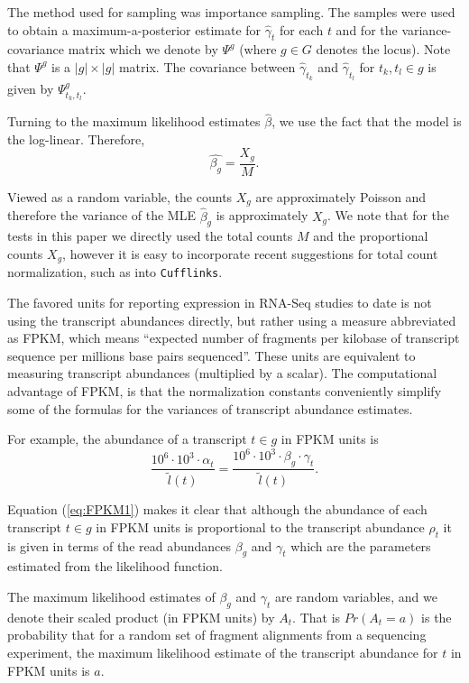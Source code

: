 \documentclass[12pt]{amsart}
\theoremstyle{definition}
\begin{document}
The method used for sampling was importance sampling. The samples were used to obtain a maximum-a-posterior estimate for
$\hat{\gamma}_t$ for each $t$ and for the variance-covariance matrix which we
denote by $\Psi^g$ (where $g \in G$ denotes the locus). Note that $\Psi^g$ is
a $|g| \times |g|$ matrix. The covariance between $\hat{\gamma}_{t_k}$ and
$\hat{\gamma}_{t_l}$ for $t_k,t_l \in g$ is given by $\Psi^g_{t_k,t_l}$.

Turning to the maximum likelihood estimates $\hat{\beta}$, we use the fact that the model is the log-linear. Therefore, 
\begin{equation}
\label{eq:sigmahat}
\hat{\beta_g} = \frac{X_{g}}{M}.
\end{equation}

Viewed as a random variable, the counts $X_{g}$ are approximately Poisson and therefore the variance of the MLE $\hat{\beta}_g$ is approximately $X_{g}$. We note that for the tests in this paper we directly used the total counts $M$ and the proportional counts $X_g$, however it is easy to incorporate recent suggestions for total count normalization, such as \cite{Bullard2010} into {\tt Cufflinks}.

The favored units for reporting expression in RNA-Seq studies to date is not
using the transcript abundances directly, but rather using a measure
abbreviated as FPKM, which means ``expected number of fragments per kilobase
of transcript sequence per millions base pairs sequenced''. These units are
equivalent to measuring transcript abundances (multiplied by a scalar). The
computational advantage of FPKM, is that the normalization constants
conveniently simplify some of the formulas for the variances of transcript
abundance estimates.

For example, the abundance of a transcript $t \in g$ in FPKM units is
\begin{equation}
\label{eq:FPKM1}
 \frac{10^6 \cdot 10^3 \cdot \alpha_t}{\tilde{l}(t)} =  \frac{10^6 \cdot 10^3 \cdot \beta_g \cdot \gamma_t}{\tilde{l}(t)}.
\end{equation}

Equation (\ref{eq:FPKM1}) makes it clear that although the abundance of each
transcript $t \in g$ in FPKM units is proportional to the transcript abundance
$\rho_t$ it is given in terms of the read abundances $\beta_g$ and $\gamma_t$
which are the parameters estimated from the likelihood function.

The maximum likelihood estimates of $\beta_g$ and $\gamma_t$ are random
variables, and we denote their scaled product (in FPKM units) by $A_t$. That
is $Pr(A_t = a)$ is the probability that for a random set of fragment alignments
from a sequencing experiment, the maximum likelihood estimate of the
transcript abundance for $t$ in FPKM units is $a$.
\end{document}
